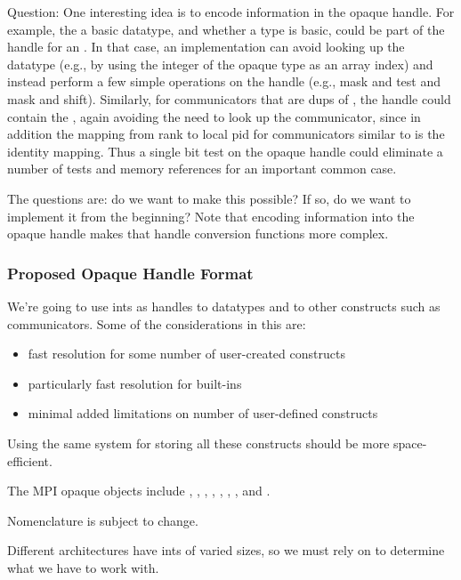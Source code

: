 \documentclass{article}
\begin{document}
Question:  One interesting idea is to encode information in the opaque
handle.  For example, the  a basic datatype, and whether
a type is basic, could be part of the handle for an
. In that case, an implementation can avoid looking
up the datatype (e.g., by using the integer of the opaque type as an
array index) and instead perform a few simple operations on the handle
(e.g., mask and test and mask and shift).  Similarly, for
communicators that are dups of , the handle could
contain the , again avoiding the need to look up the
communicator, since in addition the mapping from rank to local pid for 
communicators similar to  is the identity
mapping.  Thus a single bit test on the opaque handle could eliminate
a number of tests and memory references for an important common case.

The questions are: do we want to make this possible?  If so, do we
want to implement it from the beginning?  Note that encoding
information into the opaque handle makes that handle conversion
functions more complex.

\subsubsection{Proposed Opaque Handle Format}

We're going to use ints as handles to datatypes and to other constructs such
as communicators.  Some of the considerations in this are:
\begin{itemize}
\item fast resolution for some number of user-created constructs
\item particularly fast resolution for built-ins
\item minimal added limitations on number of user-defined constructs 
\end{itemize}

Using the same system for storing all these constructs should be more
space-efficient.

The MPI opaque objects include , ,
, , ,
, , and .

Nomenclature is subject to change.

Different architectures have ints of varied sizes, so we must rely on
 to determine what we have to work with.
\end{document}
